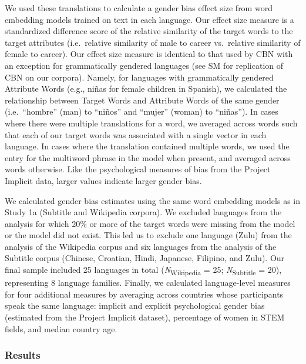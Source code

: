 \documentclass[man,floatsintext]{apa6}
\begin{document}
We used these translations to calculate a gender bias effect size from word embedding models trained on text in each language. Our effect size measure is a standardized difference score of the relative similarity of the target words to the target attributes (i.e.~relative similarity of male to career vs.~relative similarity of female to career). Our effect size measure is identical to that used by CBN with an exception for grammatically gendered languages (see SM for replication of CBN on our corpora). Namely, for languages with grammatically gendered Attribute Words (e.g., niñas for female children in Spanish), we calculated the relationship between Target Words and Attribute Words of the same gender (i.e.~\enquote{hombre} (man) to \enquote{niños} and \enquote{mujer} (woman) to \enquote{niñas}). In cases where there were multiple translations for a word, we averaged across words such that each of our target words was associated with a single vector in each language. In cases where the translation contained multiple words, we used the entry for the multiword phrase in the model when present, and averaged across words otherwise. Like the psychological measures of bias from the Project Implicit data, larger values indicate larger gender bias.

We calculated gender bias estimates using the same word embedding models as in Study 1a (Subtitle and Wikipedia corpora). We excluded languages from the analysis for which 20\% or more of the target words were missing from the model or the model did not exist. This led us to exclude one language (Zulu) from the analysis of the Wikipedia corpus and six languages from the analysis of the Subtitle corpus (Chinese, Croatian, Hindi, Japanese, Filipino, and Zulu). Our final sample included 25 languages in total (\emph{N}\textsubscript{Wikipedia} = 25; \emph{N}\textsubscript{Subtitle} = 20), representing 8 language families. Finally, we calculated language-level measures for four additional measures by averaging across countries whose participants speak the same language: implicit and explicit psychological gender bias (estimated from the Project Implicit dataset), percentage of women in STEM fields, and median country age.

\hypertarget{results-2}{%
\subsubsection{Results}\label{results-2}}
\end{document}
